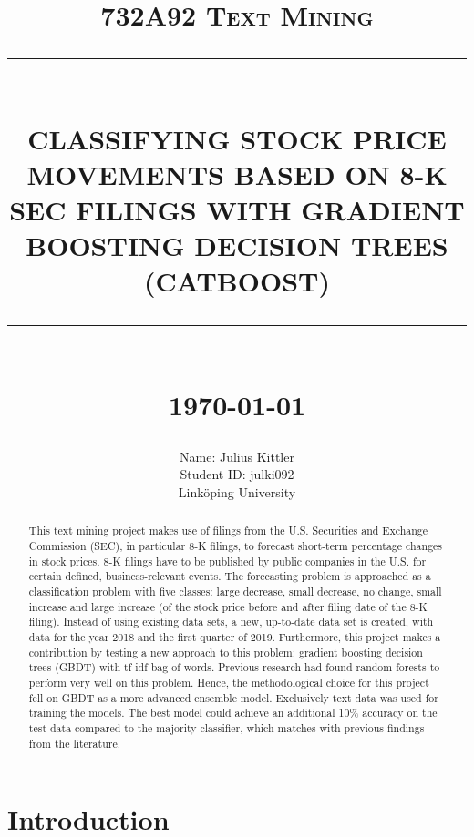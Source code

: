 \documentclass{article}
\newcommand{\HRule}[1]{\rule{\linewidth}{#1}}
\begin{document}
	
	\title{\textsc{732A92 Text Mining} \\ [2.0cm]
		\HRule{0.5pt} \\
		\LARGE \textbf{\uppercase{Classifying Stock Price Movements based on 8-K SEC filings with Gradient Boosting Decision Trees (CatBoost)}}
		\HRule{2pt} \\ [0.5cm]
		\normalsize \today \vspace*{5\baselineskip}}
	
	\date{}
	
	\author{
		Name: Julius Kittler \\ 
		Student ID: julki092 \\ 
		Link\"{o}ping University}
	
	\maketitle
	\newpage
	
	\begin{abstract}
		
	This text mining project makes use of filings from the U.S. Securities and Exchange Commission (SEC), in particular 8-K filings, to forecast short-term percentage changes in stock prices. 8-K filings have to be published by public companies in the U.S. for certain defined, business-relevant events. The forecasting problem is approached as a classification problem with five classes: large decrease, small decrease, no change, small increase and large increase (of the stock price before and after filing date of the 8-K filing). Instead of using existing data sets, a new, up-to-date data set is created, with data for the year 2018 and the first quarter of 2019. Furthermore, this project makes a contribution by testing a new approach to this problem: gradient boosting decision trees (GBDT) with tf-idf bag-of-words. Previous research had found random forests to perform very well on this problem. Hence, the methodological choice for this project fell on GBDT as a more advanced ensemble model. Exclusively text data was used for training the models. The best model could achieve an additional 10\% accuracy on the test data compared to the majority classifier, which matches with previous findings from the literature.
	
	\end{abstract}

	\newpage
	\tableofcontents
	\newpage
	\listoffigures
	\listoftables
	\newpage

	\section{Introduction}
	
\end{document}
